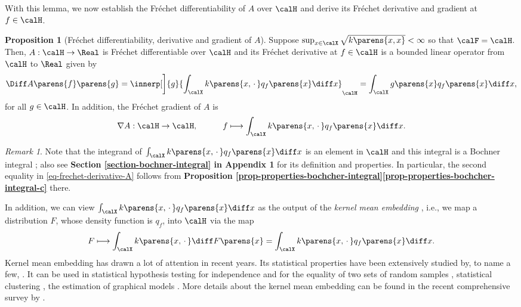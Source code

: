 \documentclass[12pt]{article}
\theoremstyle{definition}
\theoremstyle{theorem}
\newtheorem{proposition}{Proposition}
\theoremstyle{remark}
\newtheorem{remark}{Remark}
\begin{document}
With this lemma, we now establish the Fr{\'e}chet differentiability of $A$ over $\calH$ and derive its Fr{\'e}chet derivative and gradient at $f \in \calH$. 

\begin{proposition}[Fr{\'e}chet differentiability, derivative and gradient of $A$]\label{prop-frechet-derivative-A}
	Suppose $\sup_{x \in \calX} \sqrt{k \parens{x, x}} < \infty$ so that $\calF = \calH$. Then, $A: \calH \to \Real$ is Fr{\'e}chet differentiable over $\calH$ and its Fr{\'e}chet derivative at $f \in \calH$ is a bounded linear operator from $\calH$ to $\Real$ given by 
	\begin{align}\label{eq-frechet-derivative-A}
		\Diff A \parens{f} \parens{g} = \innerp[\bigg]{g}{\int_{\calX} k \parens{x, \,\cdot\,} q_f \parens{x} \diff x}_{\calH} = \int_{\calX} g \parens{x} q_f \parens{x} \diff x, 
	\end{align}
	for all $g \in \calH$. In addition, the Fr{\'e}chet gradient of $A$ is 
	\begin{align*}
		\nabla A: \calH \to \calH, \quad \qquad f \longmapsto \int_{\calX} k \parens{x, \,\cdot\,} q_f \parens{x} \diff x. 
	\end{align*}
\end{proposition}

\begin{remark}
	Note that the integrand of $\int_{\calX} k \parens{x, \,\cdot\,} q_f \parens{x} \diff x$ is an element in $\calH$ and this integral is a Bochner integral \parencite{Diestel1977-bt, Denkowski2013-ke}; also see \textbf{\color{red} Section \ref{section-bochner-integral} in Appendix 1} for its definition and properties. In particular, the second equality in \eqref{eq-frechet-derivative-A} follows from \textbf{\color{red} Proposition \ref{prop-properties-bochcher-integral}\ref{prop-properties-bochcher-integral-c}} there. 
	
	In addition, we can view $\int_{\calX} k \parens{x, \,\cdot\,} q_f \parens{x} \diff x$ as the output of the \textit{kernel mean embedding} \parencite{bertinetThomas04RKHS, hilbert-embedding-2007}, i.e., we map a distribution $F$, whose density function is $q_f$, into $\calH$ via the map 
	\begin{align}
		F \longmapsto \int_{\calX} k \parens{x, \,\cdot\,} \diff F \parens{x} = \int_{\calX} k \parens{x, \,\cdot\,} q_f \parens{x} \diff x. 
	\end{align}
	Kernel mean embedding has drawn a lot of attention in recent years. Its statistical properties have been extensively studied by, to name a few, \textcites{Le2008-dl, Sriperumbudur2010-ug, Sriperumbudur2011-db, kernel-mean-estimator-muandet}. It can be used in statistical hypothesis testing for independence \parencites{Gretton2005-tj} and for the equality of two sets of random samples \parencites{Gretton2012-zi}, statistical clustering \parencites{Jegelka2009-an}, the estimation of graphical models \parencites{Song2010-ea, Song2013-ha, Song2014-pi}. More details about the kernel mean embedding can be found in the recent comprehensive survey by \textcites{kernel-mean-embedding-survey-muandet}. 
\end{remark}
\end{document}

